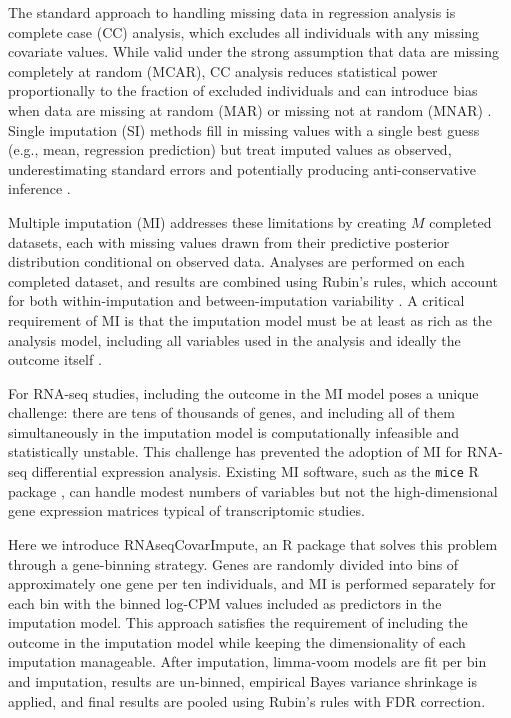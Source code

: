 \documentclass[11pt]{article}
\begin{document}
The standard approach to handling missing data in regression analysis is complete case (CC) analysis, which excludes all individuals with any missing covariate values. While valid under the strong assumption that data are missing completely at random (MCAR), CC analysis reduces statistical power proportionally to the fraction of excluded individuals and can introduce bias when data are missing at random (MAR) or missing not at random (MNAR) \citep{little2019}. Single imputation (SI) methods fill in missing values with a single best guess (e.g., mean, regression prediction) but treat imputed values as observed, underestimating standard errors and potentially producing anti-conservative inference \citep{schafer2002}.

Multiple imputation (MI) addresses these limitations by creating $M$ completed datasets, each with missing values drawn from their predictive posterior distribution conditional on observed data. Analyses are performed on each completed dataset, and results are combined using Rubin's rules, which account for both within-imputation and between-imputation variability \citep{rubin1987,vanbuuren2018}. A critical requirement of MI is that the imputation model must be at least as rich as the analysis model, including all variables used in the analysis and ideally the outcome itself \citep{meng1994}.

For RNA-seq studies, including the outcome in the MI model poses a unique challenge: there are tens of thousands of genes, and including all of them simultaneously in the imputation model is computationally infeasible and statistically unstable. This challenge has prevented the adoption of MI for RNA-seq differential expression analysis. Existing MI software, such as the \texttt{mice} R package \citep{vanbuuren2011}, can handle modest numbers of variables but not the high-dimensional gene expression matrices typical of transcriptomic studies.

Here we introduce RNAseqCovarImpute, an R package that solves this problem through a gene-binning strategy. Genes are randomly divided into bins of approximately one gene per ten individuals, and MI is performed separately for each bin with the binned log-CPM values included as predictors in the imputation model. This approach satisfies the requirement of including the outcome in the imputation model while keeping the dimensionality of each imputation manageable. After imputation, limma-voom models are fit per bin and imputation, results are un-binned, empirical Bayes variance shrinkage is applied, and final results are pooled using Rubin's rules with FDR correction.
\end{document}
